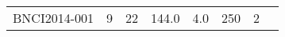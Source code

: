 \begin{tabularx}{\linewidth}{@{}Xrrrrrrr@{}}
	BNCI2014-001               & 9               & 22       & 144.0           & 4.0 & 250  & 2                 & \cite{Tangermann2012}    \\

\end{tabularx}
